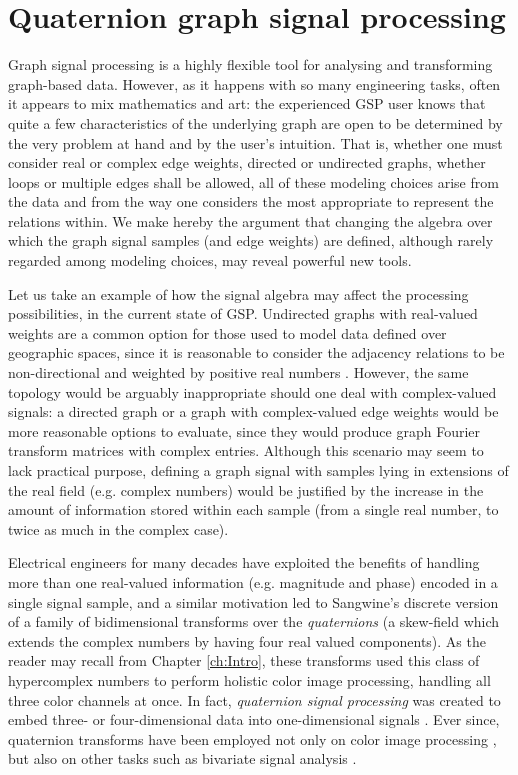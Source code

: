 \chapter{Quaternion graph signal processing}
\label{ch:QGSP}

Graph signal processing is a highly flexible tool for analysing and transforming graph-based data. However, as it happens with so many engineering tasks, often it appears to mix mathematics and art: the experienced GSP user knows that quite a few characteristics of the underlying graph are open to be determined by the very problem at hand and by the user's intuition. That is, whether one must consider real or complex edge weights, directed or undirected graphs, whether loops or multiple edges shall be allowed, all of these modeling choices arise from the data and from the way one considers the most appropriate to represent the relations within. We make hereby the argument that changing the algebra over which the graph signal samples (and edge weights) are defined, although rarely regarded among modeling choices, may reveal powerful new tools.

Let us take an example of how the signal algebra may affect the processing possibilities, in the current state of GSP. Undirected graphs with real-valued weights are a common option for those used to model data defined over geographic spaces, since it is reasonable to consider the adjacency relations to be non-directional and weighted by positive real numbers \parencite{shuman2013emerging}. However, the same topology would be arguably inappropriate should one deal with complex-valued signals: a directed graph or a graph with complex-valued edge weights would be more reasonable options to evaluate, since they would produce graph Fourier transform matrices with complex entries. Although this scenario may seem to lack practical purpose, defining a graph signal with samples lying in extensions of the real field (e.g. complex numbers) would be justified by the increase in the amount of information stored within each sample (from a single real number, to twice as much in the complex case).

Electrical engineers for many decades have exploited the benefits of handling more than one real-valued information (e.g. magnitude and phase) encoded in a single signal sample, and a similar motivation led to Sangwine's \parencite{sangwine1996fourier} discrete version of a family of bidimensional transforms over the \textit{quaternions} (a skew-field which extends the complex numbers by having four real valued components). As the reader may recall from Chapter \ref{ch:Intro}, these transforms used this class of hypercomplex numbers to perform holistic color image processing, handling all three color channels at once. In fact, \emph{quaternion signal processing} was created to embed three- or four-dimensional data into one-dimensional signals \parencite{took2008quaternion}. Ever since, quaternion transforms have been employed not only on color image processing \parencite{ell2007hypercomplex,chen2018quaternion,li2013quaternion,evans2000hypercomplex}, but also on other tasks such as bivariate signal analysis \parencite{flamant2017spectral,flamant2017time,flamant2018complete}.

